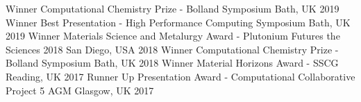 \begin{cvhonors}
  \cvhonor
    {Winner}
    {Computational Chemistry Prize - Bolland Symposium}
    {Bath, UK}
    {2019}
  \cvhonor
    {Winner}
    {Best Presentation - High Performance Computing Symposium}
    {Bath, UK}
    {2019}
  \cvhonor
    {Winner}
    {Materials Science and Metalurgy Award - Plutonium Futures the Sciences 2018}
    {San Diego, USA}
    {2018}
  \cvhonor
    {Winner}
    {Computational Chemistry Prize - Bolland Symposium}
    {Bath, UK}
    {2018}
   \cvhonor
    {Winner}
    {Material Horizons Award - SSCG}
    {Reading, UK}
    {2017}
   \cvhonor
    {Runner Up}
    {Presentation Award - Computational Collaborative Project 5 AGM}
    {Glasgow, UK}
    {2017}
\end{cvhonors}

